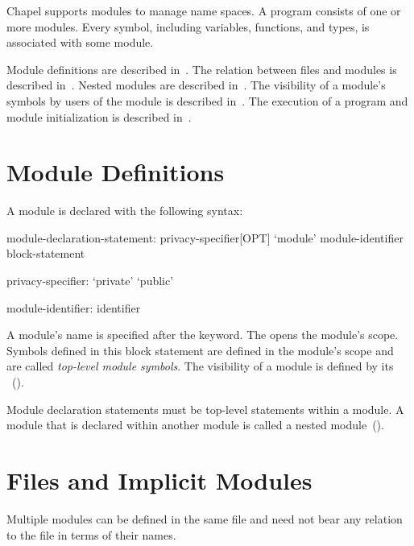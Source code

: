 \label{Modules}

Chapel supports modules to manage name spaces.  A program consists of
one or more modules.  Every symbol, including variables, functions,
and types, is associated with some module.

Module definitions are described in~.  The
relation between files and modules is described
in~.  Nested modules are described
in~.  The visibility of a module's symbols by
users of the module is described in~.  The execution
of a program and module initialization is described
in~.

\section{Module Definitions}
\label{Module_Definitions}

A module is declared with the following syntax:
\begin{syntax}
module-declaration-statement:
  privacy-specifier[OPT] `module' module-identifier block-statement

privacy-specifier:
  `private'
  `public'

module-identifier:
  identifier
\end{syntax}

A module's name is specified after the  keyword.
The  opens the module's scope.  Symbols defined
in this block statement are defined in the module's scope and are
called \emph{top-level module symbols}.  The visibility of a module is
defined by its ~().

Module declaration statements must be top-level statements within a
module.  A module that is declared within another module is called a
nested module~().

\section{Files and Implicit Modules}
\label{Implicit_Modules}

Multiple modules can be defined in the same file and need not bear any
relation to the file in terms of their names.

